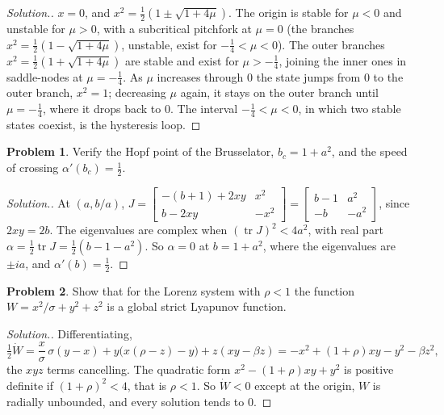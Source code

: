 \documentclass[11pt,a4paper]{article}
\numberwithin{equation}{section}
\DeclareMathOperator{\tr}{tr}
\theoremstyle{definition}
\newtheorem{problemx}{Problem}[subsection]
\newenvironment{problem}{\begin{problemx}}{\end{problemx}}
\newenvironment{solution}
  {\renewcommand{\qedsymbol}{}\begin{proof}[\textit{Solution}.]}
  {\end{proof}}
\begin{document}
\begin{solution}
$x = 0$, and $x^2 = \frac12(1 \pm \sqrt{1 + 4\mu})$. The origin is stable for $\mu < 0$ and unstable for $\mu > 0$, with a subcritical pitchfork at $\mu = 0$ (the branches $x^2 = \frac12(1 - \sqrt{1 + 4\mu})$, unstable, exist for
$-\frac14 < \mu < 0$). The outer branches $x^2 = \frac12(1 + \sqrt{1 + 4\mu})$ are stable and exist for $\mu > -\frac14$, joining the inner ones in saddle-nodes at $\mu = -\frac14$. As $\mu$ increases through $0$ the state jumps from
$0$ to the outer branch, $x^2 = 1$; decreasing $\mu$ again, it stays on the outer branch until $\mu = -\frac14$, where it drops back to $0$. The interval $-\frac14 < \mu < 0$, in which two stable states coexist, is the hysteresis loop.
\end{solution}

\begin{problem}
Verify the Hopf point of the Brusselator, $b_c = 1 + a^2$, and the speed of crossing $\alpha'(b_c) = \frac12$.
\end{problem}

\begin{solution}
At $(a, b/a)$, $J = \begin{bmatrix} -(b + 1) + 2xy & x^2\\ b - 2xy & -x^2\end{bmatrix} = \begin{bmatrix} b - 1 & a^2\\ -b & -a^2\end{bmatrix}$, since $2xy = 2b$. The eigenvalues are complex when $(\tr J)^2 < 4a^2$, with real part $\alpha = \frac12\tr J = \frac12(b - 1 - a^2)$. So
$\alpha = 0$ at $b = 1 + a^2$, where the eigenvalues are $\pm ia$, and $\alpha'(b) = \frac12$.
\end{solution}

\begin{problem}
Show that for the Lorenz system with $\rho < 1$ the function $W = x^2/\sigma + y^2 + z^2$ is a global strict Lyapunov function.
\end{problem}

\begin{solution}
Differentiating,
\[
\tfrac12\dot W = \frac{x}{\sigma}\,\sigma(y - x) + y\bigl(x(\rho - z) - y\bigr) + z(xy - \beta z) = -x^2 + (1 + \rho)xy - y^2 - \beta z^2 ,
\]
the $xyz$ terms cancelling. The quadratic form $x^2 - (1 + \rho)xy + y^2$ is positive definite if
$(1 + \rho)^2 < 4$, that is $\rho < 1$. So $\dot W < 0$ except at the origin, $W$ is radially unbounded, and every solution tends to $0$.
\end{solution}
\end{document}
